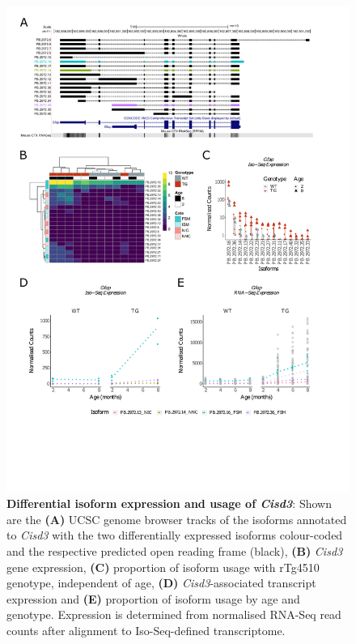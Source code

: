 \newpage
\begin{figure}[!htp]
	\centering
	\includegraphics[page=4,trim={1.5cm 3.5cm 2cm 1cm}, scale = 0.80]{Figures/Ch5_DiffPlots.pdf}
	\captionsetup{width=0.95\textwidth}
	\caption[Differential isoform expression and usage of \textit{Cisd3}]%
	{\textbf{Differential isoform expression and usage of \textit{Cisd3}}: Shown are the \textbf{(A)}  UCSC genome browser tracks of the isoforms annotated to \textit{Cisd3} with the two differentially expressed isoforms colour-coded and the respective predicted open reading frame (black), \textbf{(B)} \textit{Cisd3} gene expression, \textbf{(C)} proportion of isoform usage with rTg4510 genotype, independent of age, \textbf{(D)} \textit{Cisd3}-associated transcript expression and \textbf{(E)} proportion of isoform usage by age and genotype. Expression is determined from normalised RNA-Seq read counts after alignment to Iso-Seq-defined transcriptome.}    
	\label{fig:DIU_Cisd3}
\end{figure}


